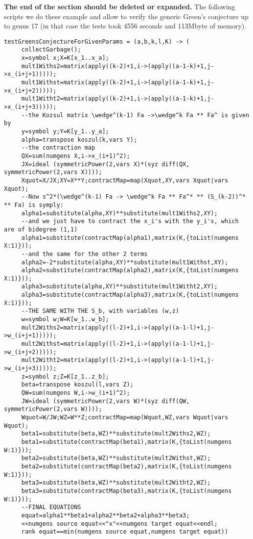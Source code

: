 \documentclass[12pt,leqno]{amsart}
\newlength{\ho}
\begin{document}
{\bf The end of the section should be deleted or expanded.}  
The following scripts we do these example and allow to verify
 the generic Green's conjecture
up to genus 17 (in that case the tests took 4556 seconds and 113Mbyte of memory).

{\scriptsize
\begin{verbatim} 
testGreensConjectureForGivenParams = (a,b,k,l,K) -> (
     collectGarbage();
     x=symbol x;X=K[x_1..x_a];
     mult1Withs2=matrix(apply((k-2)+1,i->(apply((a-1-k)+1,j->x_(i+j+1)))));
     mult1Withst=matrix(apply((k-2)+1,i->(apply((a-1-k)+1,j->x_(i+j+2)))));
     mult1Witht2=matrix(apply((k-2)+1,i->(apply((a-1-k)+1,j->x_(i+j+3)))));
     --the Kozsul matrix \wedge^(k-1) Fa ->\wedge^k Fa ** Fa^ is given by
     y=symbol y;Y=K[y_1..y_a];
     alpha=transpose koszul(k,vars Y);
     --the contraction map
     QX=sum(numgens X,i->x_(i+1)^2);
     JX=ideal (symmetricPower(2,vars X)*(syz diff(QX, symmetricPower(2,vars X))));  
     Xquot=X/JX;XY=X**Y;contractMap=map(Xquot,XY,vars Xquot|vars Xquot);
     --Now s^2*(\wedge^(k-1) Fa -> \wedge^k Fa ** Fa^* ** (S_(k-2))^* ** Fa) is symply:
     alpha1=substitute(alpha,XY)**substitute(mult1Withs2,XY);
     --and we just have to contract the x_i's with the y_i's, which are of bidegree (1,1)
     alpha1=substitute(contractMap(alpha1),matrix(K,{toList(numgens X:1)}));
     --and the same for the other 2 terms
     alpha2=-2*substitute(alpha,XY)**substitute(mult1Withst,XY);
     alpha2=substitute(contractMap(alpha2),matrix(K,{toList(numgens X:1)}));
     alpha3=substitute(alpha,XY)**substitute(mult1Witht2,XY);
     alpha3=substitute(contractMap(alpha3),matrix(K,{toList(numgens X:1)}));
     --THE SAME WITH THE S_b, with variables (w,z)
     w=symbol w;W=K[w_1..w_b];
     mult2Withs2=matrix(apply((l-2)+1,i->(apply((a-1-l)+1,j->w_(i+j+1)))));
     mult2Withst=matrix(apply((l-2)+1,i->(apply((a-1-l)+1,j->w_(i+j+2)))));
     mult2Witht2=matrix(apply((l-2)+1,i->(apply((a-1-l)+1,j->w_(i+j+3)))));
     z=symbol z;Z=K[z_1..z_b];
     beta=transpose koszul(l,vars Z);
     QW=sum(numgens W,i->w_(i+1)^2);
     JW=ideal (symmetricPower(2,vars W)*(syz diff(QW, symmetricPower(2,vars W))));  
     Wquot=W/JW;WZ=W**Z;contractMap=map(Wquot,WZ,vars Wquot|vars Wquot);
     beta1=substitute(beta,WZ)**substitute(mult2Withs2,WZ);
     beta1=substitute(contractMap(beta1),matrix(K,{toList(numgens W:1)}));
     beta2=substitute(beta,WZ)**substitute(mult2Withst,WZ);
     beta2=substitute(contractMap(beta2),matrix(K,{toList(numgens W:1)}));
     beta3=substitute(beta,WZ)**substitute(mult2Witht2,WZ);
     beta3=substitute(contractMap(beta3),matrix(K,{toList(numgens W:1)}));
     --FINAL EQUATIONS
     equat=alpha1**beta1+alpha2**beta2+alpha3**beta3;
     <<numgens source equat<<"x"<<numgens target equat<<endl;
     rank equat==min(numgens source equat,numgens target equat))
\end{verbatim}}
\end{document}
